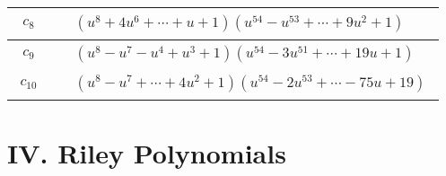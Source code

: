 \documentclass[1p]{elsarticle_modified}
\theoremstyle{definition}
\begin{document}
\begin{tabular}{m{50pt}|m{274pt}}
\hline $$\begin{aligned}c_{8}\end{aligned}$$&$\begin{aligned}
&(u^8+4 u^6+\cdots+u+1)(u^{54}- u^{53}+\cdots+9 u^2+1)
\end{aligned}$\\
\hline $$\begin{aligned}c_{9}\end{aligned}$$&$\begin{aligned}
&(u^8- u^7- u^4+u^3+1)(u^{54}-3 u^{51}+\cdots+19 u+1)
\end{aligned}$\\
\hline $$\begin{aligned}c_{10}\end{aligned}$$&$\begin{aligned}
&(u^8- u^7+\cdots+4 u^2+1)(u^{54}-2 u^{53}+\cdots-75 u+19)
\end{aligned}$\\
\hline
\end{tabular}\newpage\renewcommand{\arraystretch}{1}
\centering \section*{ IV. Riley Polynomials}
\end{document}
